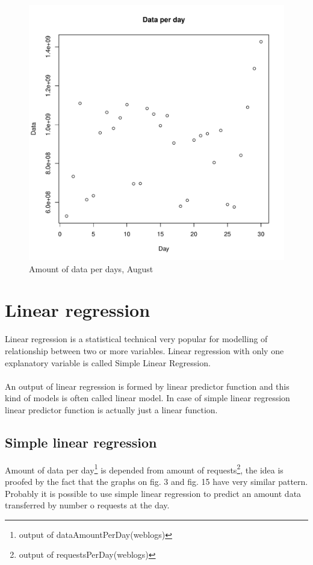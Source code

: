 \documentclass[english]{article}
\begin{document}
\begin{figure}[H]
\centerline{\includegraphics{Weblogs/Aug/DataPerDay.pdf}}
\caption{Amount of data per days, August}
\end{figure}

\section{Linear regression}
Linear regression is a statistical technical very popular for modelling of relationship between two or more variables. Linear regression with only one explanatory variable is called Simple Linear Regression.\\\\
An output of linear regression is formed by linear predictor function and this kind of models is often called linear model. In case of simple linear regression linear predictor function is actually just a linear function.
\subsection{Simple linear regression}
Amount of data per day\footnote{output of dataAmountPerDay(weblogs)} is depended from amount of requests\footnote{output of requestsPerDay(weblogs)}, the idea is proofed by the fact that the graphs on fig. 3 and fig. 15 have very similar pattern. Probably it is possible to use simple linear regression to predict an amount data transferred by number o requests at the day. 
\end{document}
